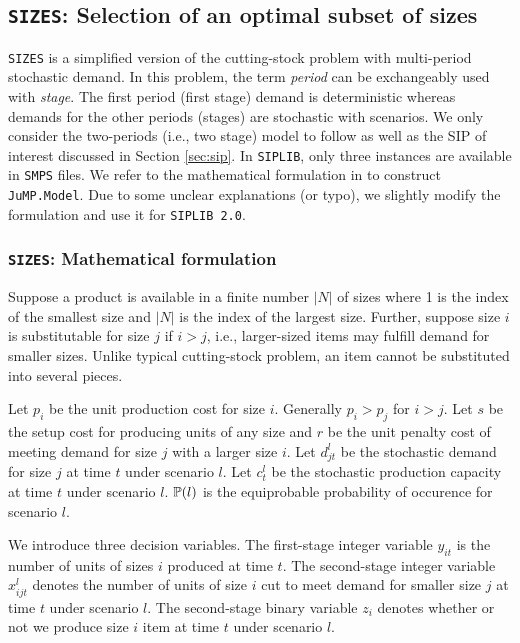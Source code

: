 \subsection{\texttt{SIZES}: Selection of an optimal subset of sizes}
\texttt{SIZES} is a simplified version of the cutting-stock problem with multi-period stochastic demand. In this problem, the term \textit{period} can be exchangeably used with \textit{stage}. The first period (first stage) demand is deterministic whereas demands for the other periods (stages) are stochastic with scenarios. We only consider the two-periods (i.e., two stage) model to follow \cite{journal:JSW1999} as well as the SIP of interest discussed in Section \ref{sec:sip}. In \texttt{SIPLIB}, only three instances are available in \texttt{SMPS} files. We refer to the mathematical formulation in \cite{journal:JSW1999} to construct \texttt{JuMP.Model}. Due to some unclear explanations (or typo), we slightly modify the formulation and use it for \texttt{SIPLIB 2.0}.

\subsubsection{\texttt{SIZES}: Mathematical formulation}
Suppose a product is available in a finite number $|N|$ of sizes where 1 is the index of the smallest size and $|N|$ is the index of the largest size. Further, suppose size $i$ is substitutable for size $j$ if $i>j$, i.e., larger-sized items may fulfill demand for smaller sizes. Unlike typical cutting-stock problem, an item cannot be substituted into several pieces. 

Let $p_i$ be the unit production cost for size $i$. Generally $p_i>p_j$ for $i>j$. Let $s$ be the setup cost for producing units of any size and $r$ be the unit penalty cost of meeting demand for size $j$ with a larger size $i$. Let $d_{jt}^l$ be the stochastic demand for size $j$ at time $t$ under scenario $l$. Let $c_t^l$ be the stochastic production capacity at time $t$ under scenario $l$. $\operatorname*{\mathbb{P}}(l)$ is the equiprobable probability of occurence for scenario $l$.

We introduce three decision variables. The first-stage integer variable $y_{it}$ is the number of units of sizes $i$ produced at time $t$. The second-stage integer variable $x_{ijt}^l$ denotes the number of units of size $i$ cut to meet demand for smaller size $j$ at time $t$ under scenario $l$. The second-stage binary variable $z_i$ denotes whether or not we produce size $i$ item at time $t$ under scenario $l$. 

